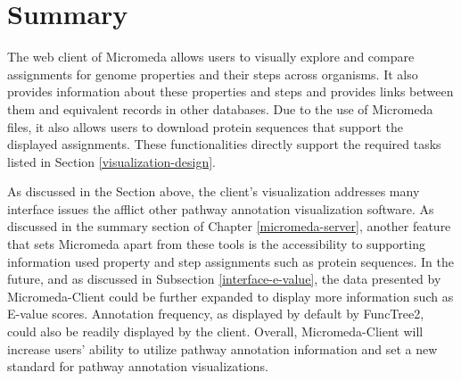 \section{Summary} \label{micromeda-client-summary}

The web client of Micromeda allows users to visually explore and compare assignments for genome properties and their steps across organisms. It also provides information about these properties and steps and provides links between them and equivalent records in other databases. Due to the use of Micromeda files, it also allows users to download protein sequences that support the displayed assignments. These functionalities directly support the required tasks listed in Section \ref{visualization-design}.

As discussed in the Section above, the client's visualization addresses many interface issues the afflict other pathway annotation visualization software. As discussed in the summary section of Chapter \ref{micromeda-server}, another feature that sets Micromeda apart from these tools is the accessibility to supporting information used property and step assignments such as protein sequences. In the future, and as discussed in Subsection \ref{interface-e-value}, the data presented by Micromeda-Client could be further expanded to display more information such as E-value scores. Annotation frequency, as displayed by default by FuncTree2, could also be readily displayed by the client. Overall, Micromeda-Client will increase users' ability to utilize pathway annotation information and set a new standard for pathway annotation visualizations.